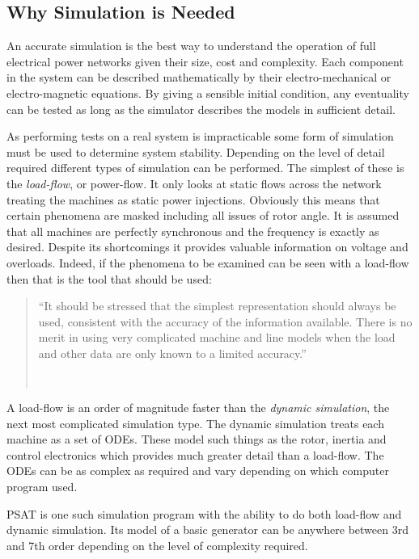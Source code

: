 \documentclass[a4paper,oneside,12pt]{report}
\newcommand{\tmpquotecite}{}%
\newenvironment{myquote}[1][]
{\renewcommand{\tmpquotecite}{#1}\begin{quote}\begin{itshape}``}
{''\end{itshape}~{\normalfont~\tmpquotecite}\end{quote}}
\begin{document}
\subsection{Why Simulation is Needed}

An accurate simulation is the best way to understand the operation of full electrical power networks given their size, cost and complexity. Each component in the system can be described mathematically by their electro-mechanical or electro-magnetic equations. By giving a sensible initial condition, any eventuality can be tested as long as the simulator describes the models in sufficient detail.

As performing tests on a real system is impracticable some form of simulation must be used to determine system stability. Depending on the level of detail required different types of simulation can be performed. The simplest of these is the \emph{load-flow}, or power-flow. It only looks at static flows across the network treating the machines as static power injections. Obviously this means that certain phenomena are masked including all issues of rotor angle. It is assumed that all machines are perfectly synchronous and the frequency is exactly as desired. Despite its shortcomings it provides valuable information on voltage and overloads. Indeed, if the phenomena to be examined can be seen with a load-flow then that is the tool that should be used:

\begin{myquote}[\cite{Weedy1998}]It should be stressed that the simplest representation should always be used, consistent with the accuracy of the information available. There is no merit in using very complicated machine and line models when the load and other data are only known to a limited accuracy.\end{myquote}

A load-flow is an order of magnitude faster than the \emph{dynamic simulation}, the next most complicated simulation type. The dynamic simulation treats each machine as a set of ODEs. These model such things as the rotor, inertia and control electronics which provides much greater detail than a load-flow. The ODEs can be as complex as required and vary depending on which computer program used.

PSAT \cite{Milano} is one such simulation program with the ability to do both load-flow and dynamic simulation. Its model of a basic generator can be anywhere between 3rd and 7th order depending on the level of complexity required.
\end{document}
